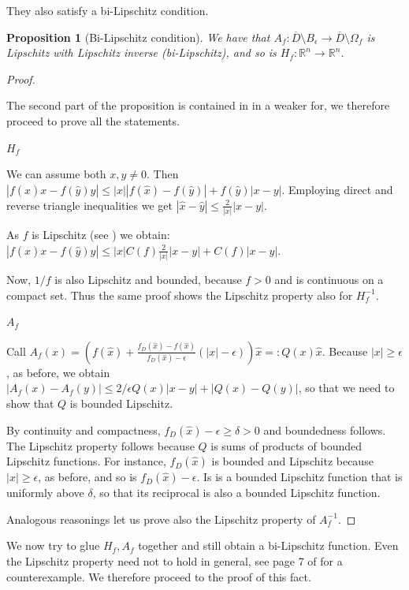 \documentclass[english,a4paper,10pt,oneside]{scrbook}	%
\theoremstyle{break}
\newtheorem{prop}[equation]{Proposition}
\newenvironment{mproof}[1][\proofname]{%
  \begin{proof}[#1]$ $\par\nobreak\ignorespaces
}{%
  \end{proof}
}
\renewcommand*{\proofname}{Proof}
\theoremstyle{remark}
\newcommand{\mR}{\mathbb{R}}
\newcommand{\xh}{\hat{x}}
\newcommand{\yh}{\hat{y}}
\newcommand{\eps}{\epsilon}
\begin{document}
They also satisfy a bi-Lipschitz condition.

\begin{prop}[Bi-Lipschitz condition]
We have that $A_f:  \overline{D}\setminus B_\eps\rightarrow \overline{D}\setminus \Omega_f $ is Lipschitz with Lipschitz inverse (bi-Lipschitz), and so is $H_f: \mR^n \rightarrow \mR^n$.
\end{prop}

\begin{mproof}

The second part of the proposition is contained in \cite{deckelnick} in a weaker for, we therefore proceed to prove all the statements.

\underline{$H_f$}

We can assume both $x,y\neq 0$. Then $|f(\xh)x-f(\yh)y|\leq |x||f(\xh)-f(\yh)|+f(\yh)|x-y|$. Employing direct and reverse triangle inequalities we get $|\xh-\yh|\leq \frac{2}{|x|}|x-y|$.

As $f$ is Lipschitz (see \cite{deckelnick}) we obtain:  $|f(\xh)x-f(\yh)y|\leq |x|C(f)\frac{2}{|x|}|x-y|+C(f)|x-y|$.

Now, $1/f$ is also Lipschitz and bounded, because $f>0$ and is continuous on a compact set. Thus the same proof shows the Lipschitz property also for $H_f^{-1}$.

\underline{$A_f$}

Call $A_f(x)=\left (  f(\xh)+\frac{f_D(\xh)-f(\xh)}{f_D(\xh)-\eps}(|x|-\eps) \right )\xh =:Q(x)\xh $. Because $|x|\geq\eps$, as before, we obtain $|A_f(x)-A_f(y)|\leq 2/\eps Q(x) |x-y|+|Q(x)-Q(y)|$, so that we need to show that $Q$ is bounded Lipschitz.

By continuity and compactness, $f_D(\xh)-\eps\geq \delta >0$ and boundedness follows. The Lipschitz property follows because $Q$ is sums of products of bounded Lipschitz functions. For instance, $f_D(\xh)$ is bounded and Lipschitz because $|x|\geq\eps$, as before, and so is $f_D(\xh)-\eps$. Is is a bounded Lipschitz function that is uniformly above $\delta$, so that its reciprocal is also a bounded Lipschitz function.

Analogous reasonings let us prove also the Lipschitz property of $A_f^{-1}$.

\end{mproof}

We now try to glue $H_f, A_f$ together and still obtain a bi-Lipschitz function. Even the Lipschitz property need not to hold in general, see page 7 of \cite{weaver} for a counterexample. We therefore proceed to the proof of this fact.
\end{document}
